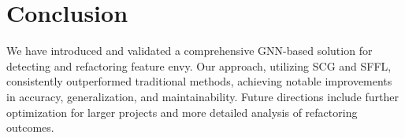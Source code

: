 \documentclass{article}
\begin{document}
\section{Conclusion}
We have introduced and validated a comprehensive GNN-based solution for detecting and refactoring feature envy. Our approach, utilizing SCG and SFFL, consistently outperformed traditional methods, achieving notable improvements in accuracy, generalization, and maintainability. Future directions include further optimization for larger projects and more detailed analysis of refactoring outcomes.
\end{document}
